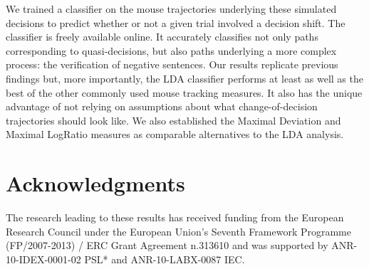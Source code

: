 \documentclass[11pt]{article}
\begin{document}
We trained a classifier on the mouse trajectories underlying these simulated decisions to predict whether or not a given trial involved a decision shift. The classifier is freely available online. It accurately classifies not only paths corresponding to quasi-decisions, but also paths underlying a more complex process: the verification of negative sentences. Our results replicate previous findings but, more importantly, the LDA classifier performs at least as well as the best of the other commonly used mouse tracking measures. It also has the unique advantage of not relying on assumptions about what change-of-decision trajectories should look like. We also established the Maximal Deviation and Maximal LogRatio measures as comparable alternatives to the LDA analysis. 


\section*{Acknowledgments}
The research leading to these results has received funding from the European Research Council under the European Union's Seventh Framework Programme (FP/2007-2013) / ERC Grant Agreement n.313610 and was supported by ANR-10-IDEX-0001-02 PSL* and ANR-10-LABX-0087 IEC.

    

\end{document}
